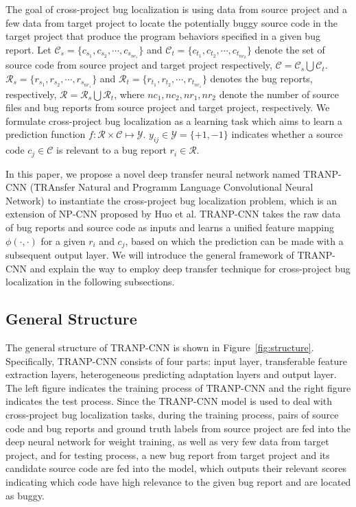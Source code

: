 The goal of cross-project bug localization is using data from source project and a few data from target project to locate the potentially buggy source code in the target project that produce the program behaviors specified in a
given bug report. Let $\mathcal{C}_s =\{ c_{s_1}, c_{s_2}, \cdots, c_{s_{nc_1}}\}$ and $\mathcal{C}_t =\{ c_{t_1}, c_{t_2}, \cdots, c_{t_{nc_2}}\}$ denote the set of source code from source project and target project respectively, $\mathcal{C}=\mathcal{C}_s \bigcup \mathcal{C}_t $. $\mathcal{R}_s =\{ r_{s_1}, r_{s_2}, \cdots, r_{s_{nr_1}}\}$ and $\mathcal{R}_t =\{ r_{t_1}, r_{t_2}, \cdots, r_{t_{nr_1}}\}$ denotes the bug reports, respectively, $\mathcal{R}=\mathcal{R}_s \bigcup \mathcal{R}_t $, where $nc_1, nc_2, nr_1, nr_2$ denote the number of source files and bug reports from source project and target project, respectively. We formulate cross-project bug localization as a learning task which aims to learn a prediction function $f: \mathcal{R} \times \mathcal{C} \mapsto \mathcal{Y}$. $y_{ij} \in \mathcal{Y} = \{+1, -1 \}$ indicates whether a source code $c_j \in \mathcal{C} $ is relevant to a bug report $r_i \in \mathcal{R}$.

In this paper, we propose a novel deep transfer neural network named TRANP-CNN (TRAnsfer Natural and Programm Language Convolutional Neural Network) to instantiate the cross-project bug localization problem, which is an extension of NP-CNN proposed by Huo et al. TRANP-CNN takes the raw data of bug reports and source code as inputs and learns a unified feature mapping $\phi(\cdot, \cdot)$ for a given $r_i$ and $c_j$, based on which the prediction can be made with a subsequent output layer. We will introduce the general framework of TRANP-CNN and explain the way to employ deep transfer technique for cross-project bug localization in the following subsections.

\subsection{General Structure}
The general structure of TRANP-CNN is shown in Figure~\ref{fig:structure}. Specifically, TRANP-CNN consists of four parts: input layer, transferable feature extraction layers, heterogeneous predicting adaptation layers and output layer. The left figure indicates the training process of TRANP-CNN and the right figure indicates the test process. Since the TRANP-CNN model is used to deal with cross-project bug localization tasks, during the training process, pairs of source code and bug reports and ground truth labels from source project are fed into the deep neural network for weight training, as well as very few data from target project, and for testing process, a new bug report from target project and its candidate source code are fed into the model, which outputs their relevant scores indicating which code have high relevance to the given bug report and are located as buggy.

